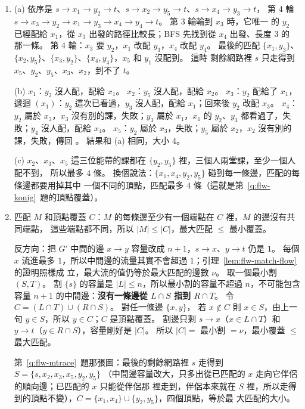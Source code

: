 \begin{enumerate}
\item (a) 依序是 $s \to x_1 \to y_2 \to t$、$s \to x_2 \to y_5 \to t$、$s \to x_4 \to y_3 \to t$，
第 4 輪 $s \to x_3 \to y_2 \to x_1 \to y_3 \to x_4 \to y_4 \to t$。 第 3 輪輪到 $x_3$ 時，它唯一
的 $y_2$ 已經配給 $x_1$，從 $x_3$ 出發的路徑比較長；BFS 先找到從 $x_4$ 出發、長度 $3$ 的
那一條。 第 4 輪：$x_3$ 要 $y_2$，$x_1$ 改配 $y_3$，$x_4$ 改配 $y_4$。 最後的匹配
$\{x_1, y_3\}$、$\{x_2, y_5\}$、$\{x_3, y_2\}$、$\{x_4, y_4\}$，$x_5$ 和 $y_1$ 沒配到。 這時
剩餘網路裡 $s$ 只走得到 $x_5$、$y_2$、$y_5$、$x_3$、$x_2$，到不了 $t$。

(b) $x_1$：$y_2$ 沒人配，配給 $x_1$。 $x_2$：$y_5$ 沒人配，配給 $x_2$。 $x_3$：$y_2$ 配給了
$x_1$，遞迴 $(x_1)$：$y_2$ 這次已看過，$y_3$ 沒人配，配給 $x_1$；回來後
$y_2$ 改配 $x_3$。 $x_4$：$y_2$ 屬於 $x_3$，$x_3$ 沒有別的課，失敗；$y_3$ 屬於 $x_1$，$x_1$ 的
$y_2$、$y_3$ 都看過了，失敗；$y_4$ 沒人配，配給 $x_4$。 $x_5$：$y_2$ 屬於 $x_3$，失敗；$y_5$
屬於 $x_2$，$x_2$ 沒有別的課，失敗，傳回 \FALSE。 結果和 (a) 相同，大小 $4$。

(c) $x_2$、$x_3$、$x_5$ 這三位能帶的課都在 $\{y_2, y_5\}$ 裡，三個人兩堂課，至少一個人配不到，
所以最多 $4$ 條。 換個說法：$\{x_1, x_4, y_2, y_5\}$ 碰到每一條邊，匹配的每條邊都要用掉其中
一個不同的頂點，匹配最多 $4$ 條（這就是第~\ref{q:flw-konig}~題的頂點覆蓋）。

\item 匹配 $M$ 和頂點覆蓋 $C$：$M$ 的每條邊至少有一個端點在 $C$ 裡，$M$ 的邊沒有共同端點，
這些端點都不同，所以 $|M| \le |C|$，最大匹配 $\le$ 最小覆蓋。

反方向：把 $G'$ 中間的邊 $x \to y$ 容量改成 $n + 1$，$s \to x$、$y \to t$ 仍是 $1$。 每個 $x$
流進最多 $1$，所以中間邊的流量其實不會超過 $1$；引理~\ref{lem:flw-match-flow} 的證明照樣成
立，最大流的值仍等於最大匹配的邊數 $\nu$。 取一個最小割 $(S, T)$。 割 $\{s\}$ 的容量是 $|L|
\le n$，所以最小割的容量不超過 $n$，不可能包含容量 $n + 1$ 的中間邊：\textbf{沒有一條邊從
$L \cap S$ 指到 $R \cap T$}。 令 $C = (L \cap T) \cup (R \cap S)$。 對任一條邊 $\{x, y\}$，
若 $x \notin C$ 則 $x \in S$，由上一句 $y \in S$，所以 $y \in C$；$C$ 是頂點覆蓋。 割邊只剩
$s \to x$（$x \in L \cap T$）和 $y \to t$（$y \in R \cap S$），容量剛好是 $|C|$。 所以
$|C| = $ 最小割 $= \nu$，最小覆蓋 $\le$ 最大匹配。

第~\ref{q:flw-mtrace}~題那張圖：最後的剩餘網路裡 $s$ 走得到 $S = \{s, x_2, x_3, x_5, y_2, y_5\}$
（中間邊容量改大，只多出從已匹配的 $x$ 走向它伴侶的順向邊；已匹配的 $x$ 只能從伴侶那
裡走到，伴侶本來就在 $S$ 裡，所以走得到的頂點不變），$C = \{x_1, x_4\} \cup \{y_2, y_5\}$，四個頂點，等於最
大匹配的大小。


\end{enumerate}
